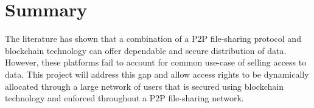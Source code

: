 
\section{Summary}

The literature has shown that a combination of a P2P file-sharing protocol and blockchain technology can offer dependable and secure distribution of data. However, these platforms fail to account for common use-case of selling access to data. This project will address this gap and allow access rights to be dynamically allocated through a large network of users that is secured using blockchain technology and enforced throughout a P2P file-sharing network.